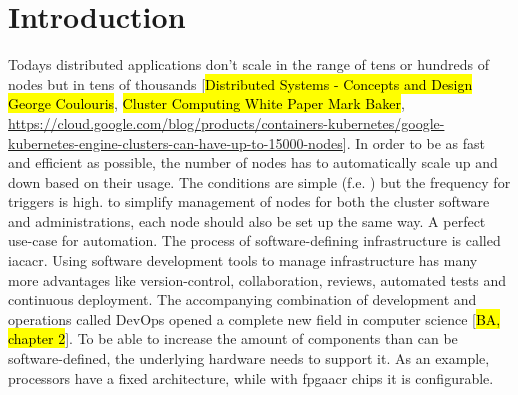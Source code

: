

\chapter{Introduction}






Todays distributed applications don't scale in the range of tens or hundreds of nodes but in tens of thousands [\hl{Distributed Systems - Concepts and Design George Coulouris}, \hl{Cluster Computing White Paper Mark Baker}, \url{https://cloud.google.com/blog/products/containers-kubernetes/google-kubernetes-engine-clusters-can-have-up-to-15000-nodes}]. In order to be as fast and efficient as possible, the number of nodes has to automatically scale up and down based on their usage. The conditions are simple (f.e. ) but the frequency for triggers is high. to simplify management of nodes for both the cluster software and administrations, each node should also be set up the same way. A perfect use-case for automation.
\newline
The process of software-defining infrastructure is called \gls{iacacr}. Using software development tools to manage infrastructure has many more advantages like version-control, collaboration, reviews, automated tests and continuous deployment. The accompanying combination of development and operations called DevOps opened a complete new field in computer science [\hl{BA, chapter 2}]. To be able to increase the amount of components than can be software-defined, the underlying hardware needs to support it. As an example, processors have a fixed architecture, while with \gls{fpgaacr} chips it is configurable.

